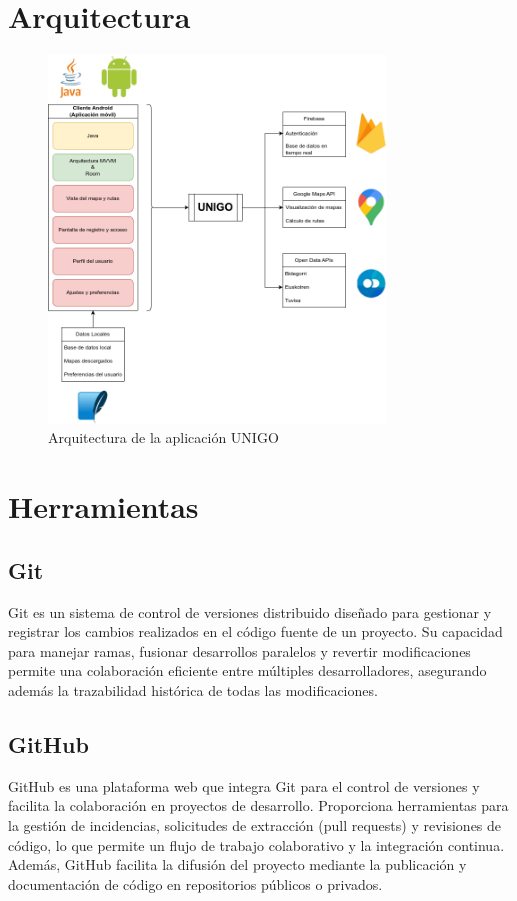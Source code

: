 \documentclass[a4paper,12pt]{report}
\begin{document}
  \chapter{Arquitectura}
    \begin{figure}[H]
      \centering
      \includegraphics[width=0.8\textwidth]{img/arquitectura.png}
      \caption{Arquitectura de la aplicación UNIGO}
      \label{fig:arquitectura}
    \end{figure}
  \chapter{Herramientas}
    \section*{Git}
      Git es un sistema de control de versiones distribuido diseñado para gestionar y registrar los cambios realizados en el código fuente de un proyecto. Su capacidad para manejar ramas, fusionar desarrollos paralelos y revertir modificaciones permite una colaboración eficiente entre múltiples desarrolladores, asegurando además la trazabilidad histórica de todas las modificaciones.
    \section*{GitHub}
      GitHub es una plataforma web que integra Git para el control de versiones y facilita la colaboración en proyectos de desarrollo. Proporciona herramientas para la gestión de incidencias, solicitudes de extracción (pull requests) y revisiones de código, lo que permite un flujo de trabajo colaborativo y la integración continua. Además, GitHub facilita la difusión del proyecto mediante la publicación y documentación de código en repositorios públicos o privados.
\end{document}
